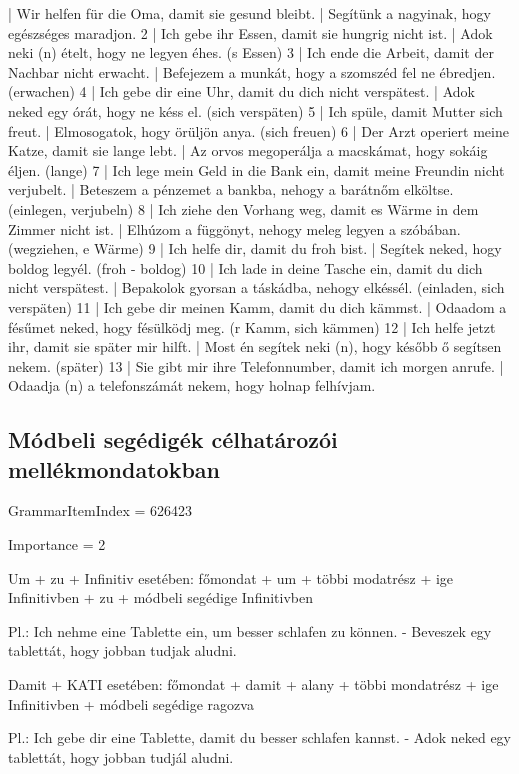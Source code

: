 \documentclass{article}
\newenvironment{desc}{\verbatim}{\endverbatim}
\newenvironment{exmp}{\verbatim}{\endverbatim}
\begin{document}
\begin{exmp}
1 | Wir helfen für die Oma, damit sie gesund bleibt. | Segítünk a nagyinak, hogy egészséges maradjon.
2 | Ich gebe ihr Essen, damit sie hungrig nicht ist. | Adok neki (n) ételt, hogy ne legyen éhes. (s Essen)
3 | Ich ende die Arbeit, damit der Nachbar nicht erwacht. | Befejezem a munkát, hogy a szomszéd fel ne ébredjen. (erwachen)
4 | Ich gebe dir eine Uhr, damit du dich nicht verspätest. | Adok neked egy órát, hogy ne késs el. (sich verspäten)
5 | Ich spüle, damit Mutter sich freut. | Elmosogatok, hogy örüljön anya. (sich freuen)
6 | Der Arzt operiert meine Katze, damit sie lange lebt. | Az orvos megoperálja a macskámat, hogy sokáig éljen. (lange)
7 | Ich lege mein Geld in die Bank ein, damit meine Freundin nicht verjubelt. | Beteszem a pénzemet a bankba, nehogy a barátnőm elköltse. (einlegen, verjubeln)
8 | Ich ziehe den Vorhang weg, damit es Wärme in dem Zimmer nicht ist. | Elhúzom a függönyt, nehogy meleg legyen a szóbában. (wegziehen, e Wärme)
9 | Ich helfe dir, damit du froh bist. | Segítek neked, hogy boldog legyél. (froh - boldog)
10 | Ich lade in deine Tasche ein, damit du dich nicht verspätest. | Bepakolok gyorsan a táskádba, nehogy elkéssél. (einladen, sich verspäten)
11 | Ich gebe dir meinen Kamm, damit du dich kämmst. | Odaadom a fésűmet neked, hogy fésülködj meg. (r Kamm, sich kämmen)
12 | Ich helfe jetzt ihr, damit sie später mir hilft. | Most én segítek neki (n), hogy később ő segítsen nekem. (später)
13 | Sie gibt mir ihre Telefonnumber, damit ich morgen anrufe. | Odaadja (n) a telefonszámát nekem, hogy holnap felhívjam.
\end{exmp}

\subsection{Módbeli segédigék célhatározói mellékmondatokban}

GrammarItemIndex = 626423

Importance = 2

\begin{desc}
Um + zu + Infinitiv esetében:
főmondat + um + többi modatrész + ige Infinitivben + zu + módbeli segédige Infinitivben

Pl.: Ich nehme eine Tablette ein, um besser schlafen zu können. - Beveszek egy tablettát, hogy jobban tudjak aludni.

Damit + KATI esetében:
főmondat + damit + alany + többi mondatrész + ige Infinitivben + módbeli segédige ragozva

Pl.: Ich gebe dir eine Tablette, damit du besser schlafen kannst. - Adok neked egy tablettát, hogy jobban tudjál aludni.
\end{desc}
\end{document}
